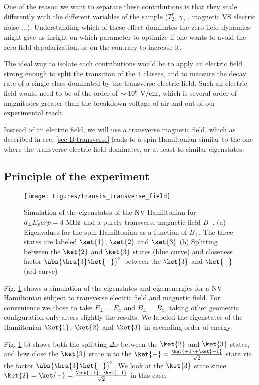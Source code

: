 \documentclass[a4paper,11pt]{report}
\begin{document}
One of the reason we want to separate these contributions is that they scale differently with the different variables of the sample ($T_2^*$, $\gamma_f$ , magnetic VS electric noise ...). Understanding which of these effect dominates the zero field dynamics might give us insight on which parameter to optimize if one wants to avoid the zero field depolarization, or on the contrary to increase it.

The ideal way to isolate each contributions would be to apply an electric field strong enough to split the transition of the 4 classes, and to measure the decay rate of a single class dominated by the transverse electric field. Such an electric field would need to be of the order of $\sim 10^6\ \rm{V/cm}$, which is several order of magnitudes greater than the breakdown voltage of air and out of our experimental reach.

Instead of an electric field, we will use a transverse magnetic field, which as described in sec. \ref{sec B transverse} leads to a spin Hamiltonian similar to the one where the transverse electric field dominates, or at least to similar eigenstates.
\subsection{Principle of the experiment}
\begin{figure}[h]
\centering
\texttt{[image: Figures/transis\_transverse\_field]}
\caption{Simulation of the eigenstates of the NV Hamiltonian for $d_\perp E_perp=4\ \rm MHz$ and a purely transverse magnetic field $B_\perp$. (a) Eigenvalues for the spin Hamiltonian as a function of $B_\perp$. The three states are labeled $\ket{1}$, $\ket{2}$ and $\ket{3}$ (b) Splitting between the $\ket{2}$ and $\ket{3}$ states (blue curve) and closeness factor $\abs{\bra{3}\ket{+}}^2$ between the $\ket{3}$ and $\ket{+}$ (red curve)}
\label{eigenstates transverse field}
\end{figure}

Fig. \ref{eigenstates transverse field} shows a simulation of the eigenstates and eigenenergies for a NV Hamiltonian subject to transverse electric field and magnetic field. For convenience we chose to take $E_\perp = E_x$ and $B_\perp = B_x$, taking other geometric configuration only alters slightly the results. We labeled the eigenstates of the Hamiltonian $\ket{1}$, $\ket{2}$ and $\ket{3}$ in ascending order of energy.

Fig. \ref{eigenstates transverse field}-b) shows both the splitting $\Delta \nu$ between the $\ket{2}$ and $\ket{3}$ states, and how close the $\ket{3}$ state is to the $\ket{+}=\frac{\ket{+1}+\ket{-1}}{\sqrt{2}}$ state via the factor $\abs{\bra{3}\ket{+}}^2$. We look at the $\ket{3}$ state since $\ket{2}=\ket{-}=\frac{\ket{+1}-\ket{-1}}{\sqrt{2}}$ in this case.
\end{document}
